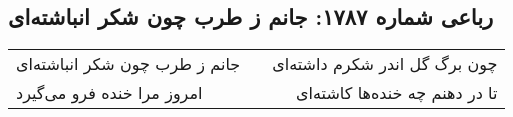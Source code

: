 \begin{center}
\section*{رباعی شماره ۱۷۸۷: جانم ز طرب چون شکر انباشته‌ای}
\label{sec:1787}
\begin{longtable}{l p{0.5cm} r}
جانم ز طرب چون شکر انباشته‌ای
&&
چون برگ گل اندر شکرم داشته‌ای
\\
امروز مرا خنده فرو می‌گیرد
&&
تا در دهنم چه خنده‌ها کاشته‌ای
\\
\end{longtable}
\end{center}
